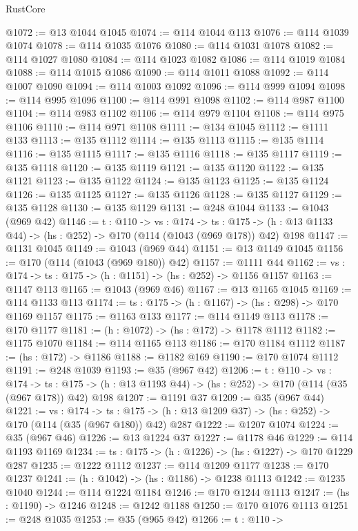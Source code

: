 \begin{lexlean}{RustCore}
\begin{coremodule}
@1072 := @13 @1044 @1045
@1074 := @114 @1044 @113
@1076 := @114 @1039 @1074
@1078 := @114 @1035 @1076
@1080 := @114 @1031 @1078
@1082 := @114 @1027 @1080
@1084 := @114 @1023 @1082
@1086 := @114 @1019 @1084
@1088 := @114 @1015 @1086
@1090 := @114 @1011 @1088
@1092 := @114 @1007 @1090
@1094 := @114 @1003 @1092
@1096 := @114 @999 @1094
@1098 := @114 @995 @1096
@1100 := @114 @991 @1098
@1102 := @114 @987 @1100
@1104 := @114 @983 @1102
@1106 := @114 @979 @1104
@1108 := @114 @975 @1106
@1110 := @114 @971 @1108
@1111 := @134 @1045
@1112 := @1111 @133
@1113 := @135 @1112
@1114 := @135 @1113
@1115 := @135 @1114
@1116 := @135 @1115
@1117 := @135 @1116
@1118 := @135 @1117
@1119 := @135 @1118
@1120 := @135 @1119
@1121 := @135 @1120
@1122 := @135 @1121
@1123 := @135 @1122
@1124 := @135 @1123
@1125 := @135 @1124
@1126 := @135 @1125
@1127 := @135 @1126
@1128 := @135 @1127
@1129 := @135 @1128
@1130 := @135 @1129
@1131 := @248 @1044
@1133 := @1043 (@969 @42)
@1146 := {t : @110} ->
  {vs : @174} ->
  {ts : @175} -> (h : @13 @1133 @44) -> (hs : @252) -> @170 (@114 (@1043 (@969 @178)) @42) @198
@1147 := @1131 @1045
@1149 := @1043 (@969 @44)
@1151 := @13 @1149 @1045
@1156 := @170 (@114 (@1043 (@969 @180)) @42)
@1157 := @1111 @44
@1162 := {vs : @174} -> {ts : @175} -> (h : @1151) -> (hs : @252) -> @1156 @1157
@1163 := @1147 @113
@1165 := @1043 (@969 @46)
@1167 := @13 @1165 @1045
@1169 := @114 @1133 @113
@1174 := {ts : @175} -> (h : @1167) -> (hs : @298) -> @170 @1169 @1157
@1175 := @1163 @133
@1177 := @114 @1149 @113
@1178 := @170 @1177
@1181 := (h : @1072) -> (hs : @172) -> @1178 @1112
@1182 := @1175 @1070
@1184 := @114 @1165 @113
@1186 := @170 @1184 @1112
@1187 := (hs : @172) -> @1186
@1188 := @1182 @169
@1190 := @170 @1074 @1112
@1191 := @248 @1039
@1193 := @35 (@967 @42)
@1206 := {t : @110} ->
  {vs : @174} ->
  {ts : @175} -> (h : @13 @1193 @44) -> (hs : @252) -> @170 (@114 (@35 (@967 @178)) @42) @198
@1207 := @1191 @37
@1209 := @35 (@967 @44)
@1221 := {vs : @174} ->
  {ts : @175} -> (h : @13 @1209 @37) -> (hs : @252) -> @170 (@114 (@35 (@967 @180)) @42) @287
@1222 := @1207 @1074
@1224 := @35 (@967 @46)
@1226 := @13 @1224 @37
@1227 := @1178 @46
@1229 := @114 @1193 @1169
@1234 := {ts : @175} -> (h : @1226) -> (hs : @1227) -> @170 @1229 @287
@1235 := @1222 @1112
@1237 := @114 @1209 @1177
@1238 := @170 @1237
@1241 := (h : @1042) -> (hs : @1186) -> @1238 @1113
@1242 := @1235 @1040
@1244 := @114 @1224 @1184
@1246 := @170 @1244 @1113
@1247 := (hs : @1190) -> @1246
@1248 := @1242 @1188
@1250 := @170 @1076 @1113
@1251 := @248 @1035
@1253 := @35 (@965 @42)
@1266 := {t : @110} ->

\end{coremodule}
\end{lexlean}
